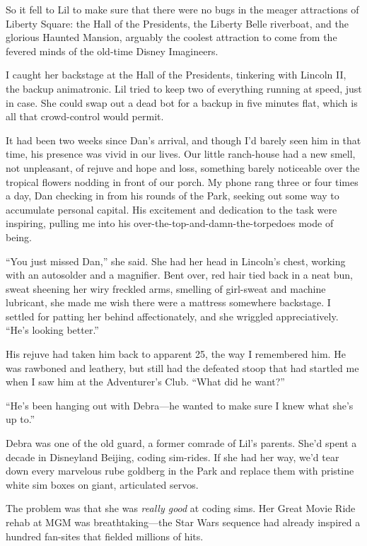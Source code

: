 So it fell to Lil to make sure that there were no bugs in the
meager attractions of Liberty Square: the Hall of the Presidents,
the Liberty Belle riverboat, and the glorious Haunted Mansion,
arguably the coolest attraction to come from the fevered minds of
the old-time Disney Imagineers.

I caught her backstage at the Hall of the Presidents, tinkering
with Lincoln II, the backup animatronic. Lil tried to keep two of
everything running at speed, just in case. She could swap out a
dead bot for a backup in five minutes flat, which is all that
crowd-control would permit.

It had been two weeks since Dan's arrival, and though I'd barely
seen him in that time, his presence was vivid in our lives. Our
little ranch-house had a new smell, not unpleasant, of rejuve and
hope and loss, something barely noticeable over the tropical
flowers nodding in front of our porch. My phone rang three or four
times a day, Dan checking in from his rounds of the Park, seeking
out some way to accumulate personal capital. His excitement and
dedication to the task were inspiring, pulling me into his
over-the-top-and-damn-the-torpedoes mode of being.

“You just missed Dan,” she said. She had her head in Lincoln's
chest, working with an autosolder and a magnifier. Bent over, red
hair tied back in a neat bun, sweat sheening her wiry freckled
arms, smelling of girl-sweat and machine lubricant, she made me
wish there were a mattress somewhere backstage. I settled for
patting her behind affectionately, and she wriggled appreciatively.
“He's looking better.”

His rejuve had taken him back to apparent 25, the way I remembered
him. He was rawboned and leathery, but still had the defeated stoop
that had startled me when I saw him at the Adventurer's Club. “What
did he want?”

“He's been hanging out with Debra—he wanted to make sure I knew
what she's up to.”

Debra was one of the old guard, a former comrade of Lil's parents.
She'd spent a decade in Disneyland Beijing, coding sim-rides. If
she had her way, we'd tear down every marvelous rube goldberg in
the Park and replace them with pristine white sim boxes on giant,
articulated servos.

The problem was that she was \emph{really good} at coding sims. Her
Great Movie Ride rehab at MGM was breathtaking—the Star Wars
sequence had already inspired a hundred fan-sites that fielded
millions of hits.

